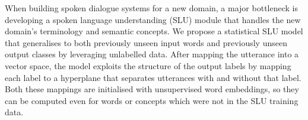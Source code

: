 When building spoken dialogue systems for a new domain, a major bottleneck is developing a spoken language understanding (SLU) module that handles the new domain's terminology and semantic concepts. We propose a statistical SLU model that generalises to both previously unseen input words and previously unseen output classes by leveraging unlabelled data. After mapping the utterance into a vector space, the model exploits the structure of the output labels by mapping each label to a hyperplane that separates utterances with and without that label. Both these mappings are initialised with unsupervised word embeddings, so they can be computed even for words or concepts which were not in the SLU training data.
